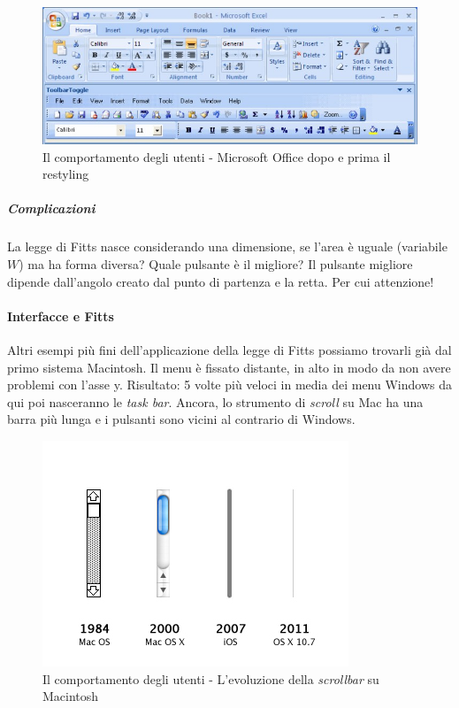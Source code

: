 					\begin{figure} [h]
						\centering
						\includegraphics[width=\textwidth]{images/IlComportamentoDegliUtenti-ImplicazioniDellaLeggeDiFitts}
						\caption[Il comportamento degli utenti - Microsoft Office dopo e prima il restyling]{Il comportamento degli utenti - Microsoft Office dopo e prima il restyling}
						\label{fig:ImplicazioniDellaLeggeDiFitts}
					\end{figure}
				
				\subparagraph{Complicazioni}
					La legge di Fitts nasce considerando una dimensione, se l'area è uguale (variabile $W$) ma ha forma diversa? Quale pulsante è il migliore? Il pulsante migliore dipende dall'angolo creato dal punto di partenza e la retta. Per cui attenzione!
					
			\paragraph{Interfacce e Fitts}
				Altri esempi più fini dell'applicazione della legge di Fitts possiamo trovarli già dal primo sistema Macintosh. Il menu è fissato distante, in alto in modo da non avere problemi con l'asse y. Risultato: 5 volte più veloci in media dei menu Windows da qui poi nasceranno le \emph{task bar}. Ancora, lo strumento di \emph{scroll} su Mac ha una barra più lunga e i pulsanti sono vicini al contrario di Windows.
				
					\begin{figure} [h]
						\centering
						\includegraphics[scale=0.8]{images/IlComportamentoDegliUtenti-InterfacceEFitts}
						\caption[Il comportamento degli utenti - Evoluzione \emph{scrollbar} su Mac]{Il comportamento degli utenti - L'evoluzione della \emph{scrollbar} su Macintosh}
						\label{fig:InterfacceEFitts}
					\end{figure}
				
